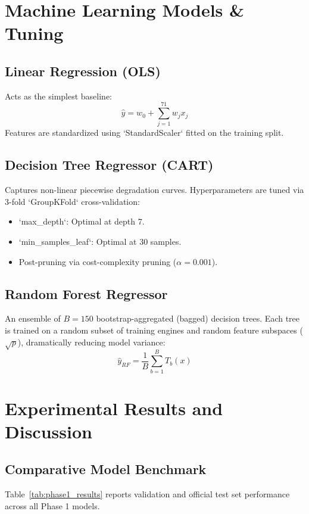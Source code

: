 \documentclass[conference]{IEEEtran}
\begin{document}
\section{Machine Learning Models \& Tuning}

\subsection{Linear Regression (OLS)}
Acts as the simplest baseline:
\begin{equation}
\hat{y} = w_0 + \sum_{j=1}^{71} w_j x_j
\end{equation}
Features are standardized using `StandardScaler` fitted on the training split.

\subsection{Decision Tree Regressor (CART)}
Captures non-linear piecewise degradation curves. Hyperparameters are tuned via 3-fold `GroupKFold` cross-validation:
\begin{itemize}
    \item `max_depth`: Optimal at depth 7.
    \item `min_samples_leaf`: Optimal at 30 samples.
    \item Post-pruning via cost-complexity pruning ($\alpha = 0.001$).
\end{itemize}

\subsection{Random Forest Regressor}
An ensemble of $B=150$ bootstrap-aggregated (bagged) decision trees. Each tree is trained on a random subset of training engines and random feature subspaces ($\sqrt{p}$), dramatically reducing model variance:
\begin{equation}
\hat{y}_{RF} = \frac{1}{B}\sum_{b=1}^{B} T_b(x)
\end{equation}

\section{Experimental Results and Discussion}

\subsection{Comparative Model Benchmark}
Table~\ref{tab:phase1_results} reports validation and official test set performance across all Phase 1 models.
\end{document}
